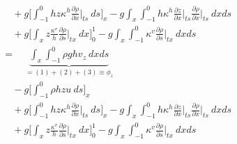 \begin{subequations}
\begin{alignat}{2}
 & && \quad + g\bigg[ \int_{-1}^0 h z \kappa^h \frac{\partial \rho}{\partial x}\bigg\rvert_{ts} \ ds \bigg]_{x} 
 - g\int_x \int_{-1}^0 h \kappa^h \frac{\partial z}{\partial x}\bigg\rvert_{ts} \frac{\partial \rho}{\partial x}\bigg\rvert_{ts} \ dx ds \\
 & && \quad + g\bigg[ \int_x z \frac{\kappa^v}{h} \frac{\partial \rho}{\partial s}\bigg\rvert_{tx} \ dx \bigg]_0^1
 - g\int_x \int_{-1}^0 \kappa^v \frac{\partial \rho}{\partial s}\bigg\rvert_{tx} \ dx ds \\
 & &&= \quad  \underbrace{\int_x \int_{-1}^0 \rho g h v_z \ dx ds}_{=(1)+(2)+(3)\equiv\phi_z}\\
 & && \quad - g\bigg[ \int_{-1}^0 \rho h z u \ ds\bigg]_{x}\\ 
 & && \quad + g\bigg[ \int_{-1}^0 h z \kappa^h \frac{\partial \rho}{\partial x}\bigg\rvert_{ts} \ ds \bigg]_{x}
 - g\int_x \int_{-1}^0 h \kappa^h \frac{\partial z}{\partial x}\bigg\rvert_{ts} \frac{\partial \rho}{\partial x}\bigg\rvert_{ts} \ dx ds \\
 & && \quad + g\bigg[ \int_x z \frac{\kappa^v}{h} \frac{\partial \rho}{\partial s}\bigg\rvert_{tx} \ dx \bigg]_0^1
 - g\int_x \int_{-1}^0 \kappa^v \frac{\partial \rho}{\partial s}\bigg\rvert_{tx} \ dx ds
  \end{alignat}
\end{subequations}

